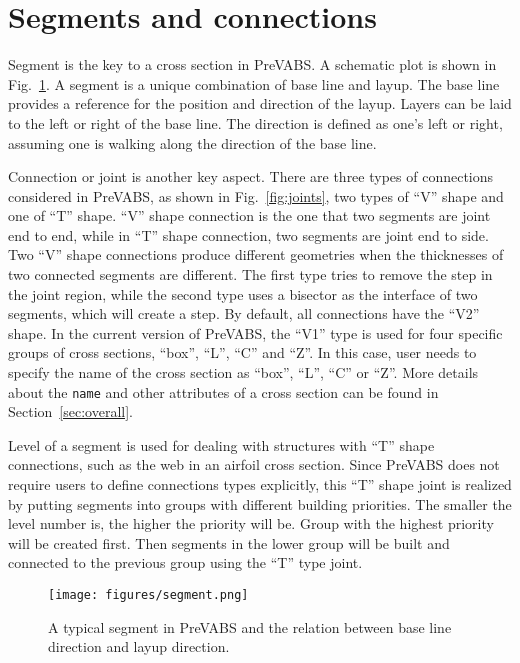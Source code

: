 \documentclass{book}
\begin{document}
\section{Segments and connections}
\label{sec:segment}

Segment is the key to a cross section in PreVABS. A schematic plot is 
shown in Fig.~\ref{fig:segment}. A segment is a unique combination of 
base line and layup. The base line provides a reference for the position 
and direction of the layup. Layers can be laid to the left or right of 
the base line. The direction is defined as one's left or right, assuming 
one is walking along the direction of the base line.

Connection or joint is another key aspect. There are three types of 
connections considered in PreVABS, as shown in Fig.~\ref{fig:joints}, 
two types of ``V'' shape and one of ``T'' shape. ``V'' shape connection 
is the one that two segments are joint end to end, while in ``T'' shape 
connection, two segments are joint end to side. Two ``V'' shape connections 
produce different geometries when the thicknesses of two connected segments 
are different. The first type tries to remove the step in the joint region, 
while the second type uses a bisector as the interface of two segments, 
which will create a step. By default, all connections have the ``V2'' shape. 
In the current version of PreVABS, the ``V1'' type is used for four 
specific groups of cross sections, ``box'', ``L'', ``C'' and ``Z''. 
In this case, user needs to specify the name of the cross section as 
``box'', ``L'', ``C'' or ``Z''. More details about the \lstinline{name} 
and other attributes of a cross section can be found in Section~\ref{sec:overall}.

Level of a segment is used for dealing with structures with ``T'' shape 
connections, such as the web in an airfoil cross section. Since PreVABS 
does not require users to define connections types explicitly, this ``T'' 
shape joint is realized by putting segments into groups with different 
building priorities. The smaller the level number is, the higher the 
priority will be. Group with the highest priority will be created first. 
Then segments in the lower group will be built and connected to the 
previous group using the ``T'' type joint.

\begin{figure}
  \centerline{\texttt{[image: figures/segment.png]}}
  \caption{A typical segment in PreVABS and the relation between base line direction and layup direction.}
  \label{fig:segment}
\end{figure}
\end{document}
